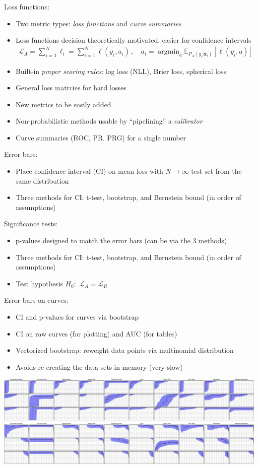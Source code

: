 \documentclass[a0,landscape]{a0poster}
\renewcommand{\vec}[1]{{\boldsymbol{\mathbf{#1}}}} %
\newcommand{\E}{\mathbb{E}}
\newcommand{\Loss}{\mathcal{L}}
\newcommand{\loss}{\ell}
\DeclareMathOperator*{\argmin}{argmin}
\begin{document}
\begin{multicols}{3}
Loss functions:
\begin{itemize}
  \item Two metric types: \emph{loss functions} and \emph{curve summaries}
  \item Loss functions decision theoretically motivated, easier for confidence intervals
  \begin{align}
    \Loss_A = \sum_{i=1}^N \loss_i = \sum_{i=1}^N \loss(y_i, a_i)\,, \quad a_i = \argmin_a \E_{P_A(y_i|\vec x_i)}[\loss(y_i, a)]
  \end{align}
  \item Built-in \emph{proper scoring rules}: log loss (NLL), Brier loss, spherical loss
  \item General loss matrcies for hard losses
  \item New metrics to be easily added
  \item Non-probabilistic methods usable by ``pipelining'' a \emph{calibrator}
  \item Curve summaries (ROC, PR, PRG) for a single number
\end{itemize}

Error bars:
\begin{itemize}
  \item Place confidence interval (CI) on mean loss with $N \rightarrow \infty$ test set from the same distribution
  \item Three methods for CI: t-test, bootstrap, and Bernstein bound (in order of assumptions)
\end{itemize}

Significance tests:
\begin{itemize}
  \item p-values designed to match the error bars (can be via the 3 methods)
  \item Three methods for CI: t-test, bootstrap, and Bernstein bound (in order of assumptions)
  \item Test hypothesis $H_0$:~$\Loss_A = \Loss_R$
\end{itemize}

Error bars on curves:
\begin{itemize}
  \item CI and p-values for curves via bootstrap
  \item CI on raw curves (for plotting) and AUC (for tables)
  \item Vectorized bootstrap: reweight data points via multinomial distribution
  \item Avoids re-creating the data sets in memory (very slow)
\end{itemize}

\includegraphics{AUC.png}
\includegraphics{AP.png}

\end{multicols}
\end{document}
